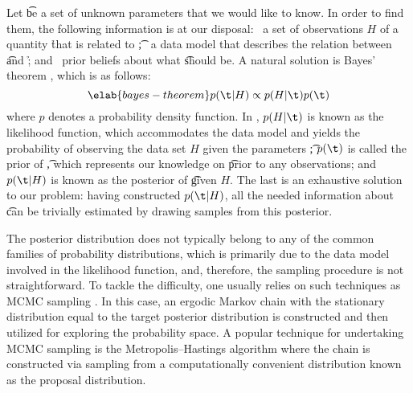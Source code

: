 Let \t be a set of unknown parameters that we would like to know. In order to
find them, the following information is at our disposal: \one~a set of
observations $H$ of a quantity \h that is related to \t; \two~a data model that
describes the relation between \t and \h; and \three~prior beliefs about what \t
should be. A natural solution is Bayes' theorem \cite{gelman2004}, which is as
follows:
\begin{equation} \elab{bayes-theorem}
  p(\t | H) \propto p(H | \t) p(\t)
\end{equation}
where $p$ denotes a probability density function. In , $p(H
| \t)$ is known as the likelihood function, which accommodates the data model
and yields the probability of observing the data set $H$ given the parameters
\t; $p(\t)$ is called the prior of \t, which represents our knowledge on \t
prior to any observations; and $p(\t | H)$ is known as the posterior of \t given
$H$. The last is an exhaustive solution to our problem: having constructed $p(\t
| H)$, all the needed information about \t can be trivially estimated by drawing
samples from this posterior.

The posterior distribution does not typically belong to any of the common
families of probability distributions, which is primarily due to the data model
involved in the likelihood function, and, therefore, the sampling procedure is
not straightforward. To tackle the difficulty, one usually relies on such
techniques as \ac{MCMC} sampling \cite{gelman2004}. In this case, an ergodic
Markov chain with the stationary distribution equal to the target posterior
distribution is constructed and then utilized for exploring the probability
space. A popular technique for undertaking \ac{MCMC} sampling is the
Metropolis--Hastings algorithm where the chain is constructed via sampling from
a computationally convenient distribution known as the proposal distribution.

